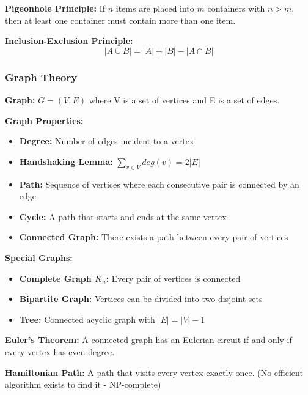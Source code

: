 \documentclass[11pt,a4paper]{article}
\begin{document}
\textbf{Pigeonhole Principle:} If $n$ items are placed into $m$ containers with $n > m$, then at least one container must contain more than one item.

\textbf{Inclusion-Exclusion Principle:}
\[
    |A \cup B| = |A| + |B| - |A \cap B|
\]

\subsubsection{Graph Theory}

\begin{defbox}
\textbf{Graph:} $G = (V, E)$ where V is a set of vertices and E is a set of edges.
\end{defbox}

\textbf{Graph Properties:}
\begin{itemize}
    \item \textbf{Degree:} Number of edges incident to a vertex
    \item \textbf{Handshaking Lemma:} $\sum_{v \in V} deg(v) = 2|E|$
    \item \textbf{Path:} Sequence of vertices where each consecutive pair is connected by an edge
    \item \textbf{Cycle:} A path that starts and ends at the same vertex
    \item \textbf{Connected Graph:} There exists a path between every pair of vertices
\end{itemize}

\textbf{Special Graphs:}
\begin{itemize}
    \item \textbf{Complete Graph $K_n$:} Every pair of vertices is connected
    \item \textbf{Bipartite Graph:} Vertices can be divided into two disjoint sets
    \item \textbf{Tree:} Connected acyclic graph with $|E| = |V| - 1$
\end{itemize}

\begin{thmbox}
\textbf{Euler's Theorem:} A connected graph has an Eulerian circuit if and only if every vertex has even degree.
\end{thmbox}

\begin{thmbox}
\textbf{Hamiltonian Path:} A path that visits every vertex exactly once. (No efficient algorithm exists to find it - NP-complete)
\end{thmbox}
\end{document}
